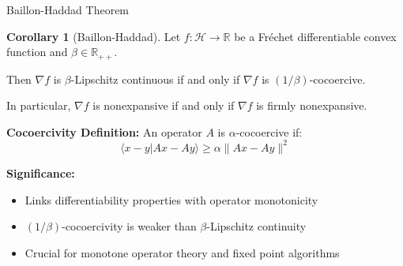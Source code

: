\documentclass[aspectratio=169,10pt]{beamer}
\theoremstyle{definition}
\newtheorem{corollary}{Corollary}
\begin{document}
\begin{frame}{Baillon-Haddad Theorem}

\begin{corollary}[Baillon-Haddad]
Let $f: \mathcal{H} \to \mathbb{R}$ be a Fréchet differentiable convex function and
$\beta \in \mathbb{R}_{++}$.

Then $\nabla f$ is $\beta$-Lipschitz continuous if and only if $\nabla f$ is
$(1/\beta)$-cocoercive.

In particular, $\nabla f$ is nonexpansive if and only if $\nabla f$ is firmly nonexpansive.
\end{corollary}

\vspace{0.3cm}

\textbf{Cocoercivity Definition:}
An operator $A$ is $\alpha$-cocoercive if:
$$\langle x - y | Ax - Ay \rangle \geq \alpha \|Ax - Ay\|^2$$

\vspace{0.3cm}

\textbf{Significance:}
\begin{itemize}
  \item Links differentiability properties with operator monotonicity
  \item $(1/\beta)$-cocoercivity is weaker than $\beta$-Lipschitz continuity
  \item Crucial for monotone operator theory and fixed point algorithms
\end{itemize}

\end{frame}
\end{document}

